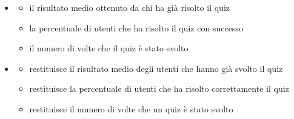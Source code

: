 \begin{itemize}
\item {}
\begin{itemize}
\item {}
\newline
il risultato medio ottenuto da chi ha già risolto il quiz
\item {}
\newline
la percentuale di utenti che ha risolto il quiz con successo
\item {}
\newline
il numero di volte che il quiz è stato svolto
\end{itemize}
\item {}
\begin{itemize}
\item {}
\newline
restituisce il risultato medio degli utenti che hanno già svolto il quiz
\newline
\item {}
\newline
restituisce la percentuale di utenti che ha risolto correttamente il quiz
\newline
\item {}
\newline
restituisce il numero di volte che un quiz è stato svolto
\newline
\end{itemize}
\end{itemize}
